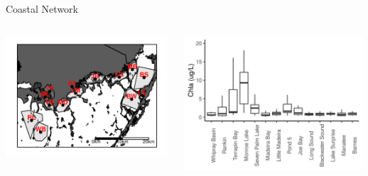 \documentclass[compress,noflama,nosectionpages]{beamer}
\begin{document}
\begin{frame}{Coastal Network}
			\begin{columns}
				\begin{column}[c]{5.3cm}
					\includegraphics[height=4.5cm,clip=true,trim = 0mm 0mm 0mm 0mm,keepaspectratio=true]{figures/fbmap_dflow.png}%
				\end{column}
				
				\begin{column}{7.0cm}
					\vspace{1em}
					\begin{center}
					\includegraphics[height=5cm,clip=true,trim = 0mm 0mm 0mm 0mm,keepaspectratio=true]{figures/chlboxplot.png}%
					\end{center}
				\end{column}
			\end{columns}
\end{frame}
\end{document}
